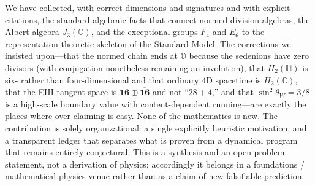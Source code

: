 \documentclass[aps,prresearch,onecolumn,amsmath,amssymb,nofootinbib]{revtex4-2}
\theoremstyle{plain}\newtheorem{theorem}{Theorem}[section]\newtheorem{proposition}[theorem]{Proposition}\newtheorem{lemma}[theorem]{Lemma}\newtheorem{corollary}[theorem]{Corollary}
\theoremstyle{definition}\newtheorem{definition}[theorem]{Definition}\newtheorem{conjecture}[theorem]{Conjecture}
\theoremstyle{remark}\newtheorem{remark}[theorem]{Remark}
\begin{document}
We have collected, with correct dimensions and signatures and with explicit citations, the standard algebraic facts that connect normed division algebras, the Albert algebra $J_3(\mathbb{O})$, and the exceptional groups $F_4$ and $E_6$ to the representation-theoretic skeleton of the Standard Model. The corrections we insisted upon---that the normed chain ends at $\mathbb{O}$ because the sedenions have zero divisors (with conjugation nonetheless remaining an involution), that $H_2(\mathbb{H})$ is six- rather than four-dimensional and that ordinary $4$D spacetime is $H_2(\mathbb{C})$, that the EIII tangent space is $\mathbf{16}\oplus\overline{\mathbf{16}}$ and not ``$28+4$,'' and that $\sin^2\theta_W=3/8$ is a high-scale boundary value with content-dependent running---are exactly the places where over-claiming is easy. None of the mathematics is new. The contribution is solely organizational: a single explicitly heuristic motivation, and a transparent ledger that separates what is proven from a dynamical program that remains entirely conjectural. This is a synthesis and an open-problem statement, not a derivation of physics; accordingly it belongs in a foundations / mathematical-physics venue rather than as a claim of new falsifiable prediction.
\end{document}
